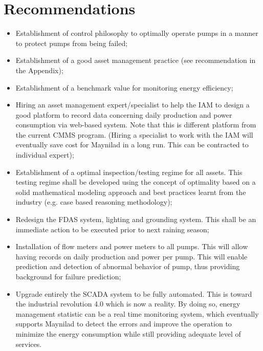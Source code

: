 \section{Recommendations}
\begin{itemize}
\item Establishment of control philosophy to optimally operate pumps in a manner to protect pumps from being failed;

\item Establishment of a good asset management practice (see recommendation in the Appendix);

\item Establishment of a benchmark value for monitoring energy efficiency;

\item Hiring an asset management expert/specialist to help the IAM to design a good platform to record data concerning daily production and power consumption via web-based system. Note that this is different platform from the current CMMS program. (Hiring a specialist to work with the IAM will eventually save cost for Maynilad in a long run. This can be contracted to individual expert);

\item Establishment of a optimal inspection/testing regime for all assets. This testing regime shall be developed using the concept of optimality based on a solid mathematical modeling approach and best practices learnt from the industry (e.g. case based reasoning methodology);

\item Redesign the FDAS system, lighting and grounding system. This shall be an immediate action to be executed prior to next raining season;

\item Installation of flow meters and power meters to all pumps. This will allow having records on daily production and power per pump. This will enable prediction and detection of abnormal behavior of pump, thus providing background for failure prediction;

\item Upgrade entirely the SCADA system to be fully automated. This is toward the industrial revolution 4.0 which is now a reality. By doing so, energy management statistic can be a real time monitoring system, which eventually supports Maynilad to detect the errors and improve the operation to minimize the energy consumption while still providing adequate level of services.

\end{itemize}



